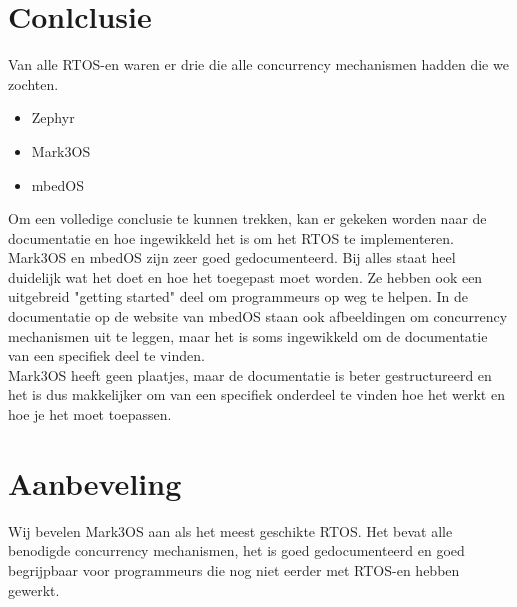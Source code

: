 \documentclass{article}
\begin{document}
\section{Conlclusie}
Van alle RTOS-en waren er drie die alle concurrency mechanismen hadden die we zochten.
\begin{itemize}
\item Zephyr
\item Mark3OS
\item mbedOS
\end{itemize}
Om een volledige conclusie te kunnen trekken, kan er gekeken worden naar de documentatie en hoe ingewikkeld het is om het RTOS te implementeren.\\
Mark3OS en mbedOS zijn zeer goed gedocumenteerd. Bij alles staat heel duidelijk wat het doet en hoe het toegepast moet worden. Ze hebben ook een uitgebreid "getting started" deel om programmeurs op weg te helpen. In de documentatie op de website van mbedOS staan ook afbeeldingen om concurrency mechanismen uit te leggen, maar het is soms ingewikkeld om de documentatie van een specifiek deel te vinden.\\
Mark3OS heeft geen plaatjes, maar de documentatie is beter gestructureerd en het is dus makkelijker om van een specifiek onderdeel te vinden hoe het werkt en hoe je het moet toepassen.
\section{Aanbeveling}
Wij bevelen Mark3OS aan als het meest geschikte RTOS. Het bevat alle benodigde concurrency mechanismen, het is goed gedocumenteerd en goed begrijpbaar voor programmeurs die nog niet eerder met RTOS-en hebben gewerkt. 

\medskip
 

\end{document}
